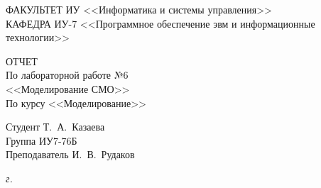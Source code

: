 \begin{titlepage}
	{
		\small \raggedright
		ФАКУЛЬТЕТ ИУ <<Информатика и системы управления>> \\
		\vspace{3.3mm}
		КАФЕДРА ИУ-7 <<Программное обеспечение эвм и информационные технологии>> \\
	}

	\vspace{15.8mm}

	{
		\LARGE
		ОТЧЕТ \\
	}
	\vspace{5mm}
	{
		\large
		По лабораторной работе №6 \\
		\vspace{2mm}
		<<Моделирование СМО>> \\
		\vspace{2mm}
		По курсу <<Моделирование>>
	}

	\vfill

	Студент \hspace*{2.5cm} \hfill  Т.~А.~Казаева\\
	Группа \hspace*{2.5cm} \hfill  	ИУ7-76Б\\
	Преподаватель \hspace*{2.5cm} \hfill  И.~В.~Рудаков\\
	
	
	\vspace{20mm}
	
	\textit{{\the\year} г.}
	
\end{titlepage}
